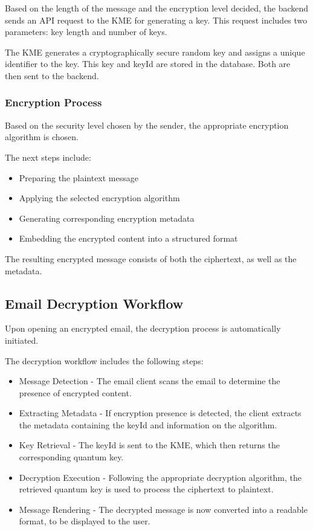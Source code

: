\documentclass[conference]{IEEEtran}
\begin{document}
Based on the length of the message and the encryption level decided, the backend sends an API request to the KME for generating a key. This request includes two parameters: key length and number of keys.

The KME generates a cryptographically secure random key and assigns a unique identifier to the key. This key and keyId are stored in the database. Both are then sent to the backend.

\subsubsection{Encryption Process}

Based on the security level chosen by the sender, the appropriate encryption algorithm is chosen.

The next steps include:
\begin{itemize}
\item
  Preparing the plaintext message
\item
  Applying the selected encryption algorithm
\item
  Generating corresponding encryption metadata
\item
  Embedding the encrypted content into a structured format
\end{itemize}

The resulting encrypted message consists of both the ciphertext, as well as the metadata.

\subsection{Email Decryption Workflow}

Upon opening an encrypted email, the decryption process is automatically initiated.

The decryption workflow includes the following steps:
\begin{itemize}
\item
  Message Detection - The email client scans the email to determine
  the presence of encrypted content.
\item
  Extracting Metadata - If encryption presence is detected, the client
  extracts the metadata containing the keyId and information on the
  algorithm.
\item
  Key Retrieval - The keyId is sent to the KME, which then returns the
  corresponding quantum key.
\item
  Decryption Execution - Following the appropriate decryption algorithm,
  the retrieved quantum key is used to process the ciphertext to
  plaintext.
\item
  Message Rendering - The decrypted message is now converted into a
  readable format, to be displayed to the user.
\end{itemize}
\end{document}

